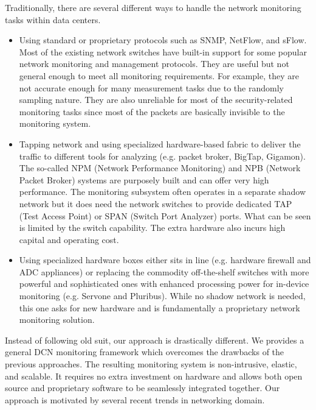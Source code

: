 \documentclass{acm_proc_article-sp}
\begin{document}
Traditionally, there are several different ways to handle the network monitoring tasks within data centers.\\
\begin{itemize}
\item Using standard or proprietary protocols such as SNMP\cite{SNMP}, NetFlow\cite{NetFlow}, and sFlow\cite{sflow}. Most of the existing network switches have built-in support for some popular network monitoring and management protocols. They are useful but not general enough to meet all monitoring requirements. For example, they are not accurate enough for many measurement tasks due to the randomly sampling nature. They are also unreliable for most of the security-related monitoring tasks since most of the packets are basically invisible to the monitoring system.
\item Tapping network and using specialized hardware-based fabric to deliver the traffic to different tools for analyzing (e.g. packet broker\cite{packetbroker}, BigTap\cite{bigtap}, Gigamon\cite{gigamon}). The so-called NPM (Network Performance Monitoring) and NPB (Network Packet Broker) systems are purposely built and can offer very high performance. The monitoring subsystem often operates in a separate shadow network but it does need the network switches to provide dedicated TAP (Test Access Point) or SPAN (Switch Port Analyzer) ports. What can be seen is limited by the switch capability. The extra hardware also incurs high capital and operating cost.
\item Using specialized hardware boxes either sits in line (e.g. hardware firewall\cite{hardware} and ADC appliances\cite{adc1,adc2}) or replacing the commodity off-the-shelf switches with more powerful and sophisticated ones with enhanced processing power for in-device monitoring (e.g. Servone\cite{servone} and Pluribus\cite{pluribus}). While no shadow network is needed, this one asks for new hardware and is fundamentally a proprietary network monitoring solution.
\end{itemize}
Instead of following old suit, our approach is drastically different. We provides a general DCN monitoring framework which overcomes the drawbacks of the previous approaches. The resulting monitoring system is non-intrusive, elastic, and scalable. It requires no extra investment on hardware and allows both open source and proprietary software to be seamlessly integrated together. Our approach is motivated by several recent trends in networking domain.\\
\end{document}
